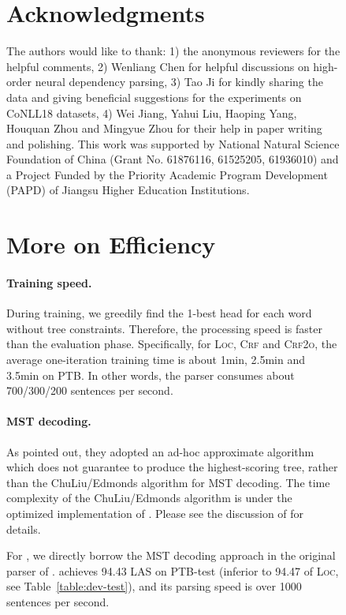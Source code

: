 \documentclass[11pt,a4paper]{article}
\begin{document}
\begin{figure}[tb]
\begin{center}
\begin{dependency}
\begin{deptext}[column sep=.16cm]
 
\section*{Acknowledgments}

The authors would like to thank: 1) the anonymous reviewers for the helpful comments, 2) Wenliang Chen for helpful discussions on high-order neural dependency parsing, 3) Tao Ji for kindly sharing the data and giving beneficial suggestions for the experiments on CoNLL18 datasets, 4)
Wei Jiang, Yahui Liu, Haoping Yang, Houquan Zhou and Mingyue Zhou for their help in paper writing and polishing.
This work was supported by National Natural Science Foundation of China (Grant No. 61876116, 61525205, 61936010) and a Project Funded by the Priority Academic Program Development (PAPD) of Jiangsu Higher Education Institutions.




\appendix
\section{More on Efficiency}
\label{section:decoding-efficiency}
\paragraph{Training speed.}
During training, we greedily find the 1-best head for each word without tree constraints.
Therefore, the processing speed is faster than the evaluation phase. Specifically, for \textsc{Loc}, \textsc{Crf} and \textsc{Crf2o}, the average one-iteration training time is about 1min, 2.5min and 3.5min on PTB.
In other words, the parser consumes about 700/300/200 sentences per second.

\paragraph{MST decoding.}
As \citet{dozat-etal-2017-stanfords} pointed out, they adopted an ad-hoc approximate algorithm which does not guarantee to produce the highest-scoring tree, rather than the ChuLiu/Edmonds algorithm for MST decoding.
The time complexity of the ChuLiu/Edmonds algorithm is  under the optimized implementation of \citet{tarjan1977finding}.
Please see the discussion of \citet{mcdonald-etal-2005-non} for details.


For , we directly borrow the MST decoding approach in the original parser of \citet{Timothy-d17-biaffine}.  achieves 94.43 LAS on PTB-test (inferior to 94.47 of \textsc{Loc}, see Table~\ref{table:dev-test}), and its parsing speed is over 1000 sentences per second.


\end{deptext}
\end{dependency}
\end{center}
\end{figure}
\end{document}
